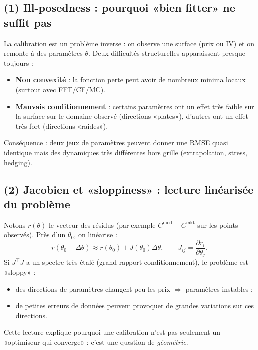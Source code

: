 
\subsection*{(1) Ill-posedness : pourquoi «bien fitter» ne suffit pas}
La calibration est un problème inverse : on observe une surface (prix ou IV) et on remonte à des paramètres $\theta$.
Deux difficultés structurelles apparaissent presque toujours :
\begin{itemize}[leftmargin=*]
\item \textbf{Non convexité} : la fonction perte peut avoir de nombreux minima locaux (surtout avec FFT/CF/MC).
\item \textbf{Mauvais conditionnement} : certains paramètres ont un effet très faible sur la surface sur le domaine observé (directions «plates»), d'autres ont un effet très fort (directions «raides»).
\end{itemize}
Conséquence : deux jeux de paramètres peuvent donner une RMSE quasi identique mais des dynamiques très différentes hors grille (extrapolation, stress, hedging).

\subsection*{(2) Jacobien et «sloppiness» : lecture linéarisée du problème}
Notons $r(\theta)$ le vecteur des résidus (par exemple $C^{\mathrm{mod}}-C^{\mathrm{mkt}}$ sur les points observés).
Près d'un $\theta_0$, on linéarise :
\[
r(\theta_0+\Delta\theta)\approx r(\theta_0)+J(\theta_0)\Delta\theta,
\qquad
J_{ij}=\frac{\partial r_i}{\partial \theta_j}.
\]
Si $J^\top J$ a un spectre très étalé (grand rapport conditionnement), le problème est «sloppy» :
\begin{itemize}[leftmargin=*]
\item des directions de paramètres changent peu les prix $\Rightarrow$ paramètres instables ;
\item de petites erreurs de données peuvent provoquer de grandes variations sur ces directions.
\end{itemize}
Cette lecture explique pourquoi une calibration n'est pas seulement un «optimiseur qui converge» : c'est une question de \emph{géométrie}.

